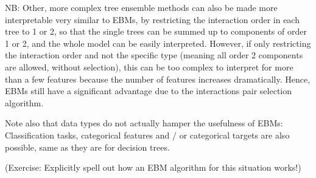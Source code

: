 \begin{enumerate}
\begin{itemize}
        NB: Other, more complex tree ensemble methods can also be made more interpretable very similar to EBMs, by restricting the interaction order in each tree to 1 or 2, so that the single trees can be summed up to components of order 1 or 2, and the whole model can be easily interpreted.
        However, if only restricting the interaction order and not the specific type (meaning all order 2 components are allowed, without selection), this can be too complex to interpret for more than a few features because the number of features increases dramatically.
        Hence, EBMs still have a significant advantage due to the interactions pair selection algorithm.

        Note also that data types do not actually hamper the usefulness of EBMs: Classification tasks, categorical features and / or categorical targets are also possible, same as they are for decision trees. 
        
        (Exercise: Explicitly spell out how an EBM algorithm for this situation works!)
    \end{itemize}


    
\end{enumerate}




